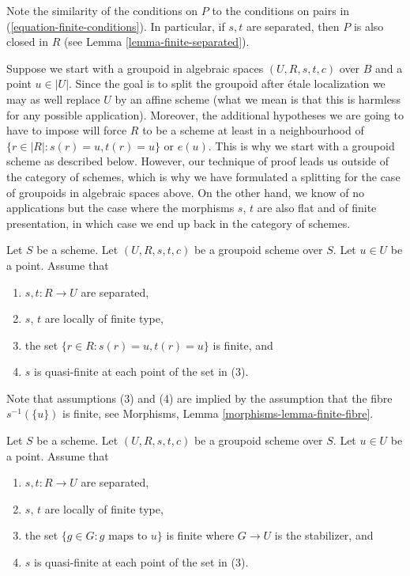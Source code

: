 \noindent
Note the similarity of the conditions on $P$ to the conditions on
pairs in (\ref{equation-finite-conditions}). In particular, if
$s, t$ are separated, then $P$ is also closed in $R$ (see
Lemma \ref{lemma-finite-separated}).

\medskip\noindent
Suppose we start with a groupoid in algebraic spaces
$(U, R, s, t, c)$ over $B$ and a point $u \in |U|$.
Since the goal is to split the groupoid after \'etale localization
we may as well replace $U$ by an affine scheme (what we mean
is that this is harmless for any possible application).
Moreover, the additional hypotheses we are going to have
to impose will force $R$ to be a scheme at least in a neighbourhood
of $\{r \in |R| : s(r) = u, t(r) = u\}$ or $e(u)$. This is why
we start with a groupoid scheme as described below.
However, our technique of proof leads us outside of the category of schemes,
which is why we have formulated a splitting for the case of groupoids
in algebraic spaces above.
On the other hand, we know of no applications but
the case where the morphisms $s$, $t$
are also flat and of finite presentation, in which case
we end up back in the category of schemes.

\begin{situation}
\label{situation-strong-splitting}
Let $S$ be a scheme.
Let $(U, R, s, t, c)$ be a groupoid scheme over $S$.
Let $u \in U$ be a point. Assume that
\begin{enumerate}
\item $s, t : R \to U$ are separated,
\item $s$, $t$ are locally of finite type,
\item the set $\{r \in R : s(r) = u, t(r) = u\}$ is finite, and
\item $s$ is quasi-finite at each point of the set in (3).
\end{enumerate}
Note that assumptions (3) and (4) are implied by the assumption
that the fibre $s^{-1}(\{u\})$ is finite, see
Morphisms, Lemma \ref{morphisms-lemma-finite-fibre}.
\end{situation}

\begin{situation}[Splitting]
\label{situation-splitting}
Let $S$ be a scheme.
Let $(U, R, s, t, c)$ be a groupoid scheme over $S$.
Let $u \in U$ be a point. Assume that
\begin{enumerate}
\item $s, t : R \to U$ are separated,
\item $s$, $t$ are locally of finite type,
\item the set $\{g \in G : g\text{ maps to }u\}$ is finite where $G \to U$
is the stabilizer, and
\item $s$ is quasi-finite at each point of the set in (3).
\end{enumerate}
\end{situation}


